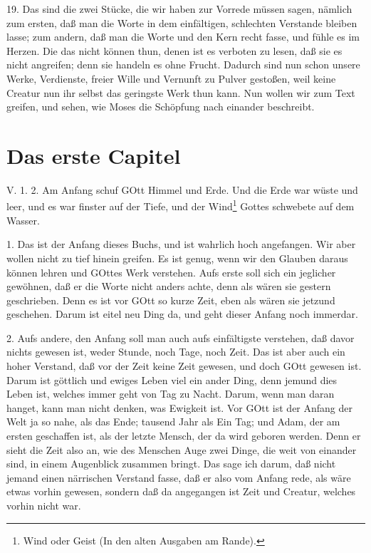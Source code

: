 19. Das sind die zwei Stücke, die wir haben zur Vorrede müssen sagen, nämlich zum ersten, daß man die Worte in dem einfältigen, schlechten Verstande bleiben lasse; zum andern, daß man die Worte und den Kern recht fasse, und fühle es im Herzen. Die das nicht können thun, denen ist es verboten zu lesen, daß sie es nicht angreifen; denn sie handeln es ohne Frucht. Dadurch sind nun schon unsere Werke, Verdienste, freier Wille und Vernunft zu Pulver gestoßen, weil keine Creatur nun ihr selbst das geringste Werk thun kann. Nun wollen wir zum Text greifen, und sehen, wie Moses die Schöpfung nach einander beschreibt.

\section{Das erste Capitel}

\begin{schriftzitat}
V. 1. 2. Am Anfang schuf GOtt Himmel und Erde. Und die Erde war wüste und leer, und es war finster auf der Tiefe, und der Wind\footnote{Wind oder Geist (In den alten Ausgaben am Rande).} Gottes schwebete auf dem Wasser.
\end{schriftzitat}

1. Das ist der Anfang dieses Buchs, und ist wahrlich hoch angefangen. Wir aber wollen nicht zu tief hinein greifen. Es ist genug, wenn wir den Glauben daraus können lehren und GOttes Werk verstehen. Aufs erste soll sich ein jeglicher gewöhnen, daß er die Worte nicht anders achte, denn als wären sie gestern geschrieben. Denn es ist vor GOtt so kurze Zeit, eben als wären sie jetzund geschehen. Darum ist eitel neu Ding da, und geht dieser Anfang noch immerdar.

2. Aufs andere, den Anfang soll man auch aufs einfältigste verstehen, daß davor nichts gewesen ist, weder Stunde, noch Tage, noch Zeit. Das ist aber auch ein hoher Verstand, daß vor der Zeit keine Zeit gewesen, und doch GOtt gewesen ist. Darum ist göttlich und ewiges Leben viel ein ander Ding, denn jemund dies Leben ist, welches immer geht von Tag zu Nacht. Darum, wenn man daran hanget, kann man nicht denken, was Ewigkeit ist. Vor GOtt ist der Anfang der Welt ja so nahe, als das Ende; tausend Jahr als Ein Tag; und Adam, der am ersten geschaffen ist, als der letzte Mensch, der da wird geboren werden. Denn er sieht die Zeit also an, wie des Menschen Auge zwei Dinge, die weit von einander sind, in einem Augenblick zusammen bringt. Das sage ich darum, daß nicht jemand einen närrischen Verstand fasse, daß er also vom Anfang rede, als wäre etwas vorhin gewesen, sondern daß da angegangen ist Zeit und Creatur, welches vorhin nicht war.

